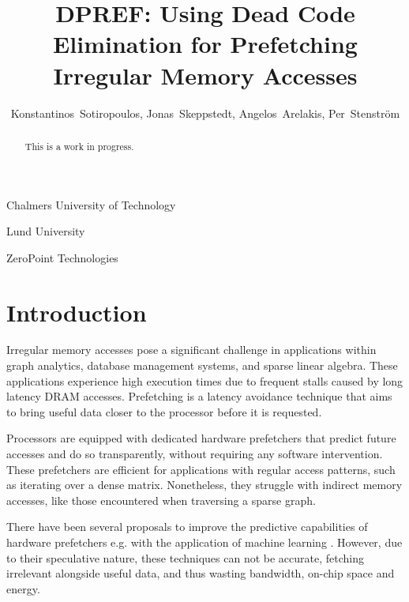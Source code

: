\documentclass{acaces}
\begin{document}
\title{DPREF: Using Dead Code Elimination for Prefetching Irregular Memory Accesses}

\author{
Konstantinos~Sotiropoulos\comma{},
Jonas~Skeppstedt\comma{},
Angelos~Arelakis\comma{},
Per~Stenstr\"{o}m\comma{}
}

\address{1}{
  Chalmers University of Technology
}

\address{2}{
  Lund University
}

\address{3}{
  ZeroPoint Technologies
}


\pagestyle{empty}

\begin{abstract}
  This is a work in progress.
\end{abstract}


\section{Introduction}

Irregular memory accesses pose a significant challenge in applications within graph analytics, database management systems, and sparse linear algebra.
These applications experience high execution times due to frequent stalls caused by long latency DRAM accesses.
Prefetching is a latency avoidance technique that aims to bring useful data closer to the processor before it is requested.

Processors are equipped with dedicated hardware prefetchers that predict future accesses and do so transparently, without requiring any software intervention.
These prefetchers are efficient for applications with regular access patterns, such as iterating over a dense matrix.
Nonetheless, they struggle with indirect memory accesses, like those encountered when traversing a sparse graph.

There have been several proposals to improve the predictive capabilities of hardware prefetchers e.g. with the application of machine learning \cite{bera_pythia_2021}.
However, due to their speculative nature, these techniques can not be accurate, fetching irrelevant alongside useful data, and thus wasting bandwidth, on-chip space and energy.
\end{document}
